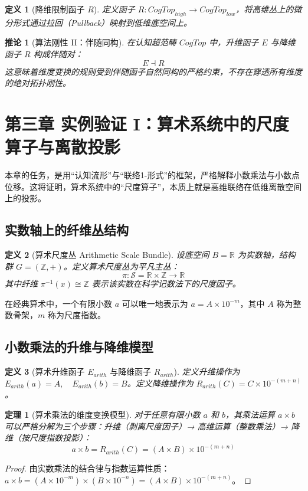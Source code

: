 \documentclass[11pt,a4paper]{article}
\newtheorem{theorem}{定理}
\newtheorem{definition}{定义}
\newtheorem{corollary}{推论}
\begin{document}
\begin{definition}[降维限制函子 \(R\)]
定义函子 \(R:CogTop_{high}\to CogTop_{low}\)，将高维丛上的微分形式通过拉回（Pullback）映射到低维底空间上。
\end{definition}

\begin{corollary}[算法刚性 II：伴随同构]
在认知超范畴 \(CogTop\) 中，升维函子 \(E\) 与降维函子 \(R\) 构成伴随对：
\[
E\dashv R
\]
这意味着维度变换的规则受到伴随函子自然同构的严格约束，不存在穿透所有维度的绝对拓扑刚性。
\end{corollary}

\clearpage
\section{第三章 实例验证 I：算术系统中的尺度算子与离散投影}
本章的任务，是用“认知流形”与“联络1-形式”的框架，严格解释小数乘法与小数点位移。这将证明，算术系统中的“尺度算子”，本质上就是高维联络在低维离散空间上的投影。

\subsection{实数轴上的纤维丛结构}
\begin{definition}[算术尺度丛 Arithmetic Scale Bundle]
设底空间 \(B=\mathbb R\) 为实数轴，结构群 \(G=(\mathbb Z,+)\)。定义算术尺度丛为平凡主丛：
\[
\pi:\mathcal S=\mathbb R\times\mathbb Z\to \mathbb R
\]
其中纤维 \(\pi^{-1}(x)\cong\mathbb Z\) 表示该实数在科学记数法下的尺度因子。
\end{definition}

在经典算术中，一个有限小数 \(a\) 可以唯一地表示为 \(a=A\times 10^{-m}\)，其中 \(A\) 称为整数骨架，\(m\) 称为尺度指数。

\subsection{小数乘法的升维与降维模型}
\begin{definition}[算术升维函子 \(E_{arith}\) 与降维函子 \(R_{arith}\)]
定义升维操作为 \(E_{arith}(a)=A,\quad E_{arith}(b)=B\)。定义降维操作为 \(R_{arith}(C)=C\times 10^{-(m+n)}\)。
\end{definition}

\begin{theorem}[算术乘法的维度变换模型]
对于任意有限小数 \(a\) 和 \(b\)，其乘法运算 \(a\times b\) 可以严格分解为三个步骤：升维（剥离尺度因子）→ 高维运算（整数乘法）→ 降维（按尺度指数投影）：
\[
a\times b=R_{arith}(C)=(A\times B)\times 10^{-(m+n)}
\]
\end{theorem}
\begin{proof}
由实数乘法的结合律与指数运算性质：\(a\times b=(A\times 10^{-m})\times(B\times 10^{-n})=(A\times B)\times 10^{-(m+n)}\)。
\end{proof}
\end{document}
